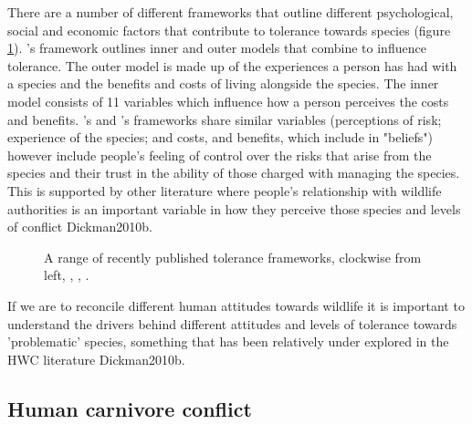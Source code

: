 There are a number of different frameworks that outline different psychological, social and economic factors that contribute to tolerance towards species (figure \ref{fig:A_toleranceframe}). \citet{Kansky2016}'s framework outlines inner and outer models that combine to influence tolerance. The outer model is made up of the experiences a person has had with a species and the benefits and costs of living alongside the species. The inner model consists of 11 variables which influence how a person perceives the costs and benefits. \citet{Bruskotter2014d}'s and \citet{Inskip2016}'s frameworks share similar variables (perceptions of risk; experience of the species; and costs, and benefits, which \citet{Inskip2016} include in "beliefs") however \citet{Bruskotter2014d} include people's feeling of control over the risks that arise from the species and their trust in the ability of those charged with managing the species. This is supported by other literature where people's relationship with wildlife authorities is an important variable in how they perceive those species and levels of conflict {Dickman2010b}.\\

\begin{figure}[htb]
\centering
\setlength\fboxsep{0pt}
\setlength\fboxrule{1pt}
\caption{A range of recently published tolerance frameworks, clockwise from left, \citet{Inskip2016}, \citet{Bruskotter2014d}, \citet{Kansky2016}.}
\label{fig:A_toleranceframe}
\end{figure}

If we are to reconcile different human attitudes towards wildlife it is important to understand the drivers behind different attitudes and levels of tolerance towards 'problematic' species, something that has been relatively under explored in the HWC literature {Dickman2010b}.\\

\subsection{Human carnivore conflict}

